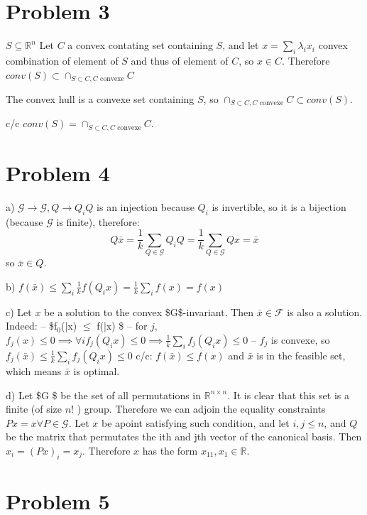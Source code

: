 \documentclass[11pt]{article}
\begin{document}
\section{Problem 3}
\label{sec:orgheadline3}
\(S \subseteq \mathbb R^n\)
Let \(C\) a convex contating set containing \(S\), and let \(x = \sum_i \lambda_i x_i\) convex combination of element of \(S\) and thus of element of \(C\), so \(x \in C\). Therefore \(conv(S) \subset \cap_{S \subset C, C \text{ convexe}} C\)

The convex hull is a convexe set containing \(S\), so \(\cap_{S \subset C, C \text{ convexe}} C \subset  conv(S)\).

c/c \(conv(S) = \cap_{S \subset C, C \text{ convexe}} C\).


\section{Problem 4}
\label{sec:orgheadline4}
a)
\(\mathcal G \rightarrow \mathcal G, Q \rightarrow Q_iQ\)  is an injection because \(Q_i\) is invertible, so it is a bijection (because \(\mathcal G\) is finite), therefore:
$$Q\bar x = \frac1k \sum_{Q \in \mathcal G} Q_iQ = \frac1k \sum_{Q \in \mathcal G} Qx = \bar x$$
so \(\bar x \in Q\).

b) \(f(\bar x) \le \sum_i \frac1k f(Q_ix) = \frac1k \sum_i  f(x) = f(x)\)

c) Let \(x\) be a solution to the convex \$\mathcal G\$-invariant. Then \(\bar x \in \mathcal F\) is also a solution. Indeed:
-- \$f\(_{\text{0}}\)(\bar x) \(\le\) f(\bar x) \$
-- for \(j\), \(f_j(x) \le 0 \implies \forall i f_j(Q_i x) \le 0 \implies  \frac1k \sum_i f_j(Q_i x) \le 0\)
-- \(f_j\) is convexe, so \(f_j(\bar x)  \le \frac1k \sum_i f_j(Q_i x) \le 0\)
c/c: \(f(\bar x) \le f(x)\) and \(\bar x\) is in the feasible set, which means \(\bar x\) is optimal.

d) Let \$\mathcal G \$ be the set of all permutations in \(\mathbb R^{n \times n}\). It is clear that this set is a finite (of size \(n!\) ) group.
Therefore we can adjoin the equality constraints \(Px = x \forall P \in \mathcal G\). Let \(x\) be apoint satisfying such condition, and let \(i, j \le n\), and \(Q\) be the matrix that permutates the ith and jth vector of the canonical basis. Then \(x_i = (Px)_i = x_j\). Therefore \(x\)  has the form \(x_11, x_1 \in \mathbb R\).

\section{Problem 5}
\label{sec:orgheadline5}
\end{document}
